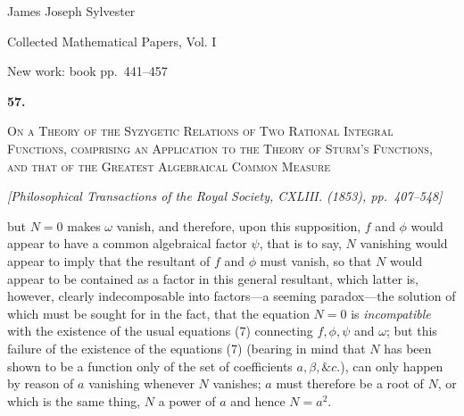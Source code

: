 \documentclass[11pt]{article}
\newcommand{\paperhead}[3]{%
  \clearpage
  \begin{center}
  {\Large\bfseries #1.}\par\vspace{0.85em}
  {\large\scshape #2}\par\vspace{0.6em}
  {\itshape [#3]}\par
  \end{center}\vspace{0.4em}}
\newcommand{\sourcepage}[1]{\marginpar{\scriptsize p.~#1}}
\begin{document}
\begin{center}
{\Large James Joseph Sylvester}\par\vspace{0.25em}
{\large Collected Mathematical Papers, Vol. I}\par\vspace{0.25em}
{\normalsize New work: book pp.~441--457}\par
\end{center}
\thispagestyle{empty}
\vspace{0.75em}

\paperhead{57}{On a Theory of the Syzygetic Relations of Two Rational Integral Functions, comprising an Application to the Theory of Sturm's Functions, and that of the Greatest Algebraical Common Measure}{Philosophical Transactions of the Royal Society, CXLIII. (1853), pp.~407--548}

\sourcepage{441}
but $N=0$ makes $\omega$ vanish, and therefore, upon this supposition, $f$ and $\phi$ would appear to have a common algebraical factor $\psi$, that is to say, $N$ vanishing would appear to imply that the resultant of $f$ and $\phi$ must vanish, so that $N$ would appear to be contained as a factor in this general resultant, which latter is, however, clearly indecomposable into factors---a seeming paradox---the solution of which must be sought for in the fact, that the equation $N=0$ is \emph{incompatible} with the existence of the usual equations (7) connecting $f,\phi,\psi$ and $\omega$; but this failure of the existence of the equations (7) (bearing in mind that $N$ has been shown to be a function only of the set of coefficients $a,\beta,\&c.$), can only happen by reason of $a$ vanishing whenever $N$ vanishes; $a$ must therefore be a root of $N$, or which is the same thing, $N$ a power of $a$ and hence $N=a^2$.
\end{document}
